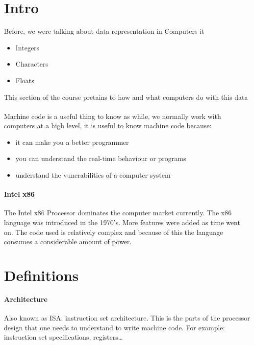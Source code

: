 \documentclass[12pt]{book}
\title{\coursetitle\linebreak\lecturename}
\author{\\Cain Susko\\ 
           \\ \\ \\
      Queen's University 
    \\School of Computing\\}
\begin{document}
\begin{titlepage}
        \maketitle
\end{titlepage}


\section*{Intro}
Before, we were talking about data representation in Computers it 
\begin{itemize}
        \item Integers
        \item Characters
        \item Floats
\end{itemize}

This section of the course pretains to how and what computers do with this data

\paragraph{}
Machine code is a useful thing to know as while, we normally work with computers at a high level, it is useful to know 
machine code because:
\begin{itemize}
        \item it can make you a better programmer
        \item you can understand the real-time behaviour or programs
        \item understand the vunerabilities of a computer system
\end{itemize}

\paragraph{Intel x86}
The Intel x86 Processor dominates the computer market currently. 
The x86 language was introduced in the 1970's. More features were added as time went on. The code used 
is relatively complex and because of this the language consumes a considerable amount of power.

\section*{Definitions}
\paragraph{Architecture}
Also known as ISA: instruction set architecture.
This is the parts of the processor design that one needs to understand to write machine code. For example: instruction set specifications,
        registers\ldots
\end{document}
